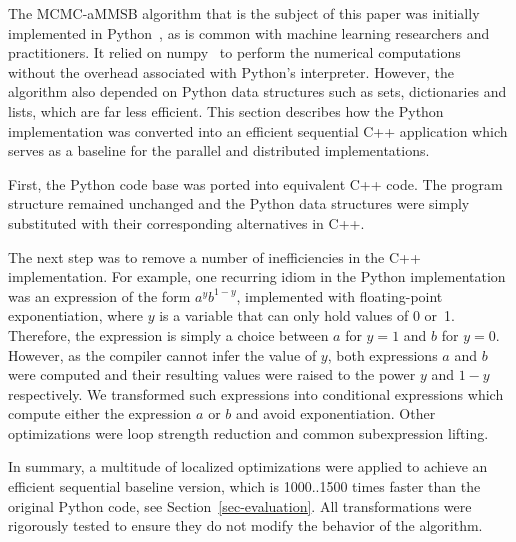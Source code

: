 The MCMC-aMMSB algorithm that is the subject of this paper was initially
implemented in Python~\cite{LiAW15}, as is common
with machine learning researchers and practitioners. It
relied on numpy~\cite{numpy} to perform the numerical computations without the
overhead associated with Python's interpreter. However, the algorithm also
depended on Python data structures such as sets, dictionaries and
lists, which are far less efficient.
This section describes how the Python implementation was
converted into an efficient sequential C++ application which serves as a
baseline for the parallel and distributed implementations.

First, the Python code base was ported into equivalent C++ code.
The program structure remained unchanged and the Python data structures were
simply substituted with their corresponding alternatives in C++.

The next step was to remove a number of inefficiencies in the C++
implementation. For example, one recurring idiom in the Python implementation
was an expression of the form $a^y b^{1-y}$, implemented with floating-point
exponentiation, where $y$ is a variable that can
only hold values of 0 or~1. Therefore, the expression is simply a choice
between $a$ for $y=1$ and $b$ for $y=0$. However, as the compiler cannot infer
the value of $y$, both expressions $a$ and $b$ were computed and their
resulting values were raised to the power $y$ and $1-y$ respectively.
We transformed such expressions into conditional expressions which
compute either the expression $a$ or $b$ and avoid exponentiation.
%
Other optimizations were loop strength
reduction and common subexpression lifting.

In summary, a multitude of localized optimizations were applied to achieve
an efficient sequential baseline version, which is 1000..1500 times faster
than the original Python code, see Section~\ref{sec-evaluation}.
All transformations were rigorously tested to ensure they do
not modify the behavior of the algorithm.

\begin{comment}
Further, we replaced calls to the system's random
functions with a custom implementation of the random generator
\textit{xorshift\_128}~\cite{Marsaglia:2003:XR}. This way, random calls no longer
involve system calls, so we can support easy and fast multi-threaded random
calls by providing each thread with its private, differently seeded, random
generator.
\end{comment}
